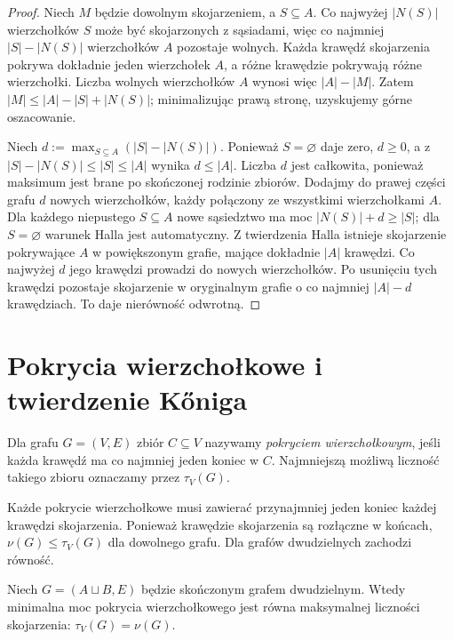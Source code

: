 \begin{proof}
Niech $M$ będzie dowolnym skojarzeniem, a $S\subseteq A$.
Co najwyżej $|N(S)|$ wierzchołków $S$ może być
skojarzonych z sąsiadami, więc co najmniej
$|S|-|N(S)|$ wierzchołków $A$ pozostaje wolnych.
Każda krawędź skojarzenia pokrywa dokładnie jeden
wierzchołek $A$, a różne krawędzie pokrywają różne
wierzchołki. Liczba wolnych wierzchołków $A$ wynosi
więc $|A|-|M|$. Zatem $|M|\le|A|-|S|+|N(S)|$; minimalizując
prawą stronę, uzyskujemy górne oszacowanie.

Niech $d:=\max_{S\subseteq A}(|S|-|N(S)|)$.
Ponieważ $S=\varnothing$ daje zero, $d\ge0$,
a z $|S|-|N(S)|\le |S|\le |A|$ wynika $d\le|A|$.
Liczba $d$ jest całkowita, ponieważ maksimum
jest brane po skończonej rodzinie zbiorów.
Dodajmy do prawej części grafu $d$ nowych
wierzchołków, każdy połączony ze wszystkimi
wierzchołkami $A$. Dla każdego niepustego $S\subseteq A$
nowe sąsiedztwo ma moc $|N(S)|+d\ge|S|$;
dla $S=\varnothing$ warunek Halla jest automatyczny.
Z twierdzenia Halla istnieje skojarzenie
pokrywające $A$ w powiększonym grafie, mające
dokładnie $|A|$ krawędzi.
Co najwyżej $d$ jego krawędzi prowadzi do nowych
wierzchołków. Po usunięciu tych krawędzi
pozostaje skojarzenie w oryginalnym grafie
o co najmniej $|A|-d$ krawędziach.
To daje nierówność odwrotną.
\end{proof}

\section{Pokrycia wierzchołkowe i twierdzenie Kőniga}
\label{sec:tg-konig}

\begin{definicja}
Dla grafu $G=(V,E)$ zbiór $C\subseteq V$ nazywamy
\emph{pokryciem wierzchołkowym}, jeśli każda krawędź
ma co najmniej jeden koniec w $C$.
Najmniejszą możliwą liczność takiego zbioru
oznaczamy przez $\tau_V(G)$.
\end{definicja}

Każde pokrycie wierzchołkowe musi zawierać przynajmniej
jeden koniec każdej krawędzi skojarzenia. Ponieważ
krawędzie skojarzenia są rozłączne w końcach,
$\nu(G)\le\tau_V(G)$ dla dowolnego grafu. Dla grafów
dwudzielnych zachodzi równość.

\begin{twierdzenie}[Kőnig]
\label{thm:tg-konig}
Niech $G=(A\sqcup B,E)$ będzie skończonym grafem
dwudzielnym. Wtedy minimalna moc pokrycia
wierzchołkowego jest równa maksymalnej liczności
skojarzenia: $\tau_V(G)=\nu(G)$.
\end{twierdzenie}

